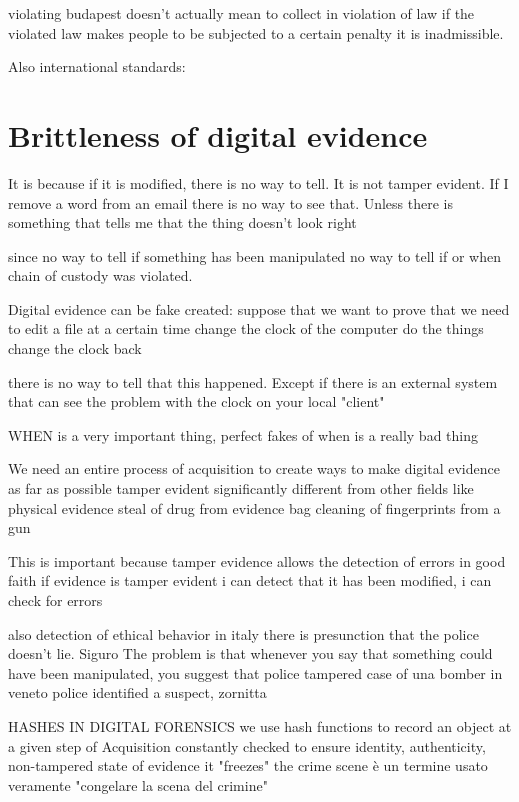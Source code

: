     violating budapest doesn't actually mean to collect in violation of law
    if the violated law makes people to be subjected to a certain penalty it is inadmissible.

    Also international standards:

\section{Brittleness of digital evidence}
    It is because if it is modified, there is no way to tell. It is not tamper evident.
    If I remove a word from an email there is no way to see that. Unless there is something that tells me that the thing doesn't look right 

    since no way to tell if something has been manipulated
    no way to tell if or when chain of custody was violated.

    Digital evidence can be fake created:
        suppose that we want to prove that we need to edit a file at a certain time
        change the clock of the computer
        do the things 
        change the clock back 

        there is no way to tell that this happened. Except if there is an external system that can see the problem with the clock on your local "client"

        WHEN is a very important thing, perfect fakes of when is a really bad thing

We need an entire process of acquisition to create ways to make digital evidence as far as possible tamper evident 
    significantly different from other fields like physical evidence
        steal of drug from evidence bag 
        cleaning of fingerprints from a gun 

This is important because 
    tamper evidence allows the detection of errors in good faith 
    if evidence is tamper evident i can detect that it has been modified, i can check for errors 

    also detection of ethical behavior 
        in italy there is presunction that the police doesn't lie. Siguro
        The problem is that whenever you say that something could have been manipulated, you suggest that police tampered 
        case of una bomber in veneto
        police identified a suspect, zornitta 

HASHES IN DIGITAL FORENSICS 
    we use hash functions to record an object at a given step of Acquisition
    constantly checked to ensure identity, authenticity, non-tampered state of evidence 
    it "freezes" the crime scene è un termine usato veramente "congelare la scena del crimine"

